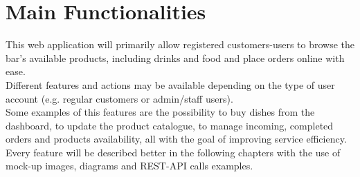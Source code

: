 \section{Main Functionalities}


This web application will primarily allow registered customers-users to browse the bar's available products, including drinks and food and place orders online with ease.\\
Different features and actions may be available depending on the type of user account (e.g. regular customers or admin/staff users).\\
Some examples of this features are the possibility to buy dishes from the dashboard, to update the product catalogue, to manage incoming, completed orders and products availability, all with the goal of improving service efficiency. Every feature will be described better in the following chapters with the use of mock-up images, diagrams and REST-API calls examples.
    